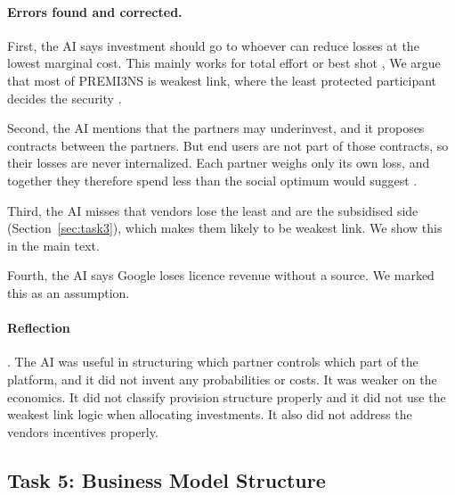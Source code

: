\paragraph{Errors found and corrected.}
First, the AI says investment should go to whoever can reduce losses at the
lowest marginal cost. This mainly works for total effort or best shot \parencite[p.~1--2]{varian2004}, We argue that most of PREMI3NS is weakest link, where the least protected participant decides the security \parencite[slide 21]{kianpour2026slides}.

Second, the AI mentions that the partners may underinvest, and it proposes contracts between the partners. But end users are not part of those
contracts, so their losses are never internalized. Each partner weighs only its own
loss, and together they therefore spend less than the social optimum would suggest
\parencite[slide 15]{kianpour2026slides}.

Third, the AI misses that vendors lose the least and are the subsidised side (Section~\ref{sec:task3}), which makes them likely to be weakest link. We show this in the main text.

Fourth, the AI says Google loses licence revenue without a source. We marked this as an assumption.

\paragraph{Reflection}. The AI was useful in structuring which partner controls which part of
the platform, and it did not invent any probabilities or costs. It was weaker on the economics. It did not classify provision structure properly and it did not use the weakest link logic when allocating investments. It also did not address the vendors incentives properly. 

\subsection{Task 5: Business Model Structure}


